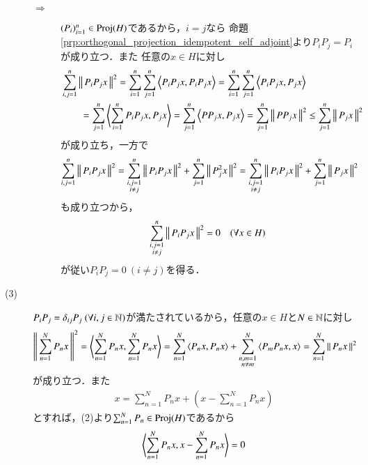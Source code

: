 \begin{prf}
\begin{description}
\begin{description}
					\item[$\Rightarrow$] 
						$(P_i)_{i=1}^{n} \in \mathrm{Proj}( H )$であるから，$i = j$なら
						命題\ref{prp:orthogonal_projection_idempotent_self_adjoint}より$P_i P_j = P_i$が成り立つ．また
						任意の$x \in H$に対し
						\begin{align}
							&\sum_{i,j=1}^{n} \Norm{P_i P_j x}{}^2
							= \sum_{i=1}^{n} \sum_{j=1}^{n} \inprod<P_i P_j x, P_i P_j x>
							= \sum_{i=1}^{n} \sum_{j=1}^{n} \inprod<P_i P_j x, P_j x> \\
							&\qquad = \sum_{j=1}^{n} \inprod<\sum_{i=1}^{n} P_i P_j x, P_j x>
							= \sum_{j=1}^{n} \inprod<P P_j x, P_j x>
							= \sum_{j=1}^{n} \Norm{P P_j x}{}^2
							\leq \sum_{j=1}^{n} \Norm{P_j x}{}^2
						\end{align}
						が成り立ち，一方で
						\begin{align}
							\sum_{i,j=1}^{n} \left\|\, P_i P_j x\, \right\|_{}^2
							= \sum_{\substack{i,j=1 \\ i \neq j}}^{n} \left\|\, P_i P_j x\, \right\|_{}^2
								+ \sum_{j=1}^{n} \left\|\, P_j^2 x\, \right\|_{}^2
							= \sum_{\substack{i,j=1 \\ i \neq j}}^{n} \left\|\, P_i P_j x\, \right\|_{}^2
								+ \sum_{j=1}^{n} \left\|\, P_j x\, \right\|_{}^2
						\end{align}
						も成り立つから，
						\begin{align}
							\sum_{\substack{i,j=1 \\ i \neq j}}^{n} \left\|\, P_i P_j x\, \right\|_{}^2 = 0
							\quad (\forall x \in H)
						\end{align}
						が従い$P_i P_j = 0\ (i \neq j)$を得る．
						\QED
				\end{description}
			\item[(3)] 
				$P_i P_j = \delta_{ij} P_j \ (\forall i,j \in \mathbb{N})$が満たされているから，任意の$x \in H$と$N \in \mathbb{N}$に対し
				\begin{align}
					\Norm{\sum_{n=1}^{N} P_n x}{}^2 
					= \inprod<\sum_{n=1}^{N} P_n x, \sum_{n=1}^{N} P_n x>
					= \sum_{n=1}^{N} \inprod<P_n x, P_n x> + \sum_{\substack{n,m=1 \\ n \neq m}}^{N} \inprod<P_m P_n x, x>
					= \sum_{n=1}^{N} \Norm{P_n x}{}^2
				\end{align}
				が成り立つ．また
				\begin{align}
					x = \sum_{n=1}^{N} P_n x + \left( x - \sum_{n=1}^{N} P_n x \right)
				\end{align}
				とすれば，(2)より$\sum_{n=1}^{N} P_n \in \mathrm{Proj}( H )$であるから
				\begin{align}
					\inprod<\sum_{n=1}^{N} P_n x, x - \sum_{n=1}^{N} P_n x> = 0

\end{align}
\end{description}
\end{prf}
